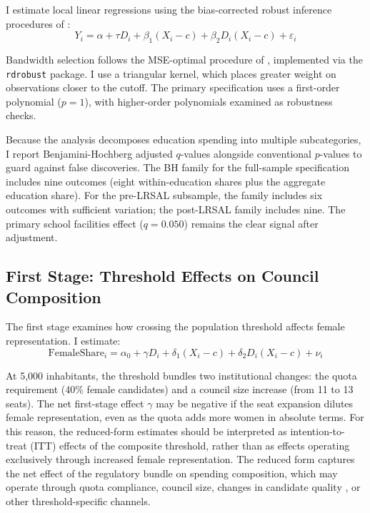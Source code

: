\documentclass[12pt]{article}
\begin{document}
I estimate local linear regressions using the bias-corrected robust inference procedures of \citet{calonico2014robust}:
\begin{equation}
    Y_i = \alpha + \tau D_i + \beta_1 (X_i - c) + \beta_2 D_i (X_i - c) + \varepsilon_i
\end{equation}

Bandwidth selection follows the MSE-optimal procedure of \citet{calonico2014robust}, implemented via the \texttt{rdrobust} package. I use a triangular kernel, which places greater weight on observations closer to the cutoff. The primary specification uses a first-order polynomial ($p = 1$), with higher-order polynomials examined as robustness checks.

Because the analysis decomposes education spending into multiple subcategories, I report Benjamini-Hochberg adjusted $q$-values \citep{benjamini1995controlling} alongside conventional $p$-values to guard against false discoveries. The BH family for the full-sample specification includes nine outcomes (eight within-education shares plus the aggregate education share). For the pre-LRSAL subsample, the family includes six outcomes with sufficient variation; the post-LRSAL family includes nine. The primary school facilities effect ($q = 0.050$) remains the clear signal after adjustment.

\subsection{First Stage: Threshold Effects on Council Composition}

The first stage examines how crossing the population threshold affects female representation. I estimate:
\begin{equation}
    \text{FemaleShare}_i = \alpha_0 + \gamma D_i + \delta_1 (X_i - c) + \delta_2 D_i (X_i - c) + \nu_i
\end{equation}

At 5,000 inhabitants, the threshold bundles two institutional changes: the quota requirement (40\% female candidates) and a council size increase (from 11 to 13 seats). The net first-stage effect $\gamma$ may be negative if the seat expansion dilutes female representation, even as the quota adds more women in absolute terms. For this reason, the reduced-form estimates should be interpreted as intention-to-treat (ITT) effects of the composite threshold, rather than as effects operating exclusively through increased female representation. The reduced form captures the net effect of the regulatory bundle on spending composition, which may operate through quota compliance, council size, changes in candidate quality \citep{baltrunaite2014quotas}, or other threshold-specific channels.
\end{document}

